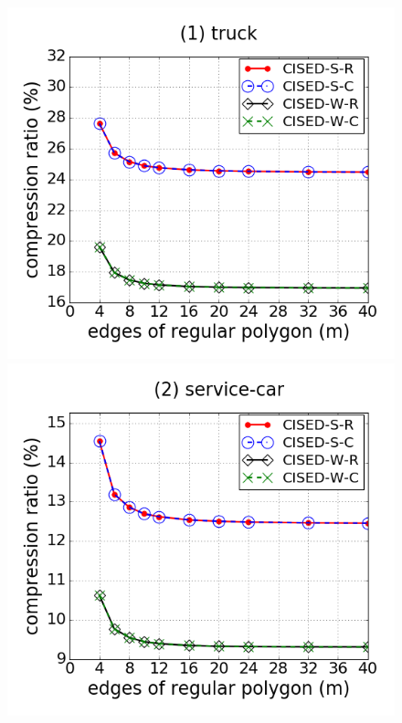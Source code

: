 \begin{figure}[tb!]
\centering
\includegraphics[scale = 0.240]{figures/Exp-M-e-60-CR-truck.png}
\includegraphics[scale = 0.240]{figures/Exp-M-e-60-CR-service.png}

\end{figure}

